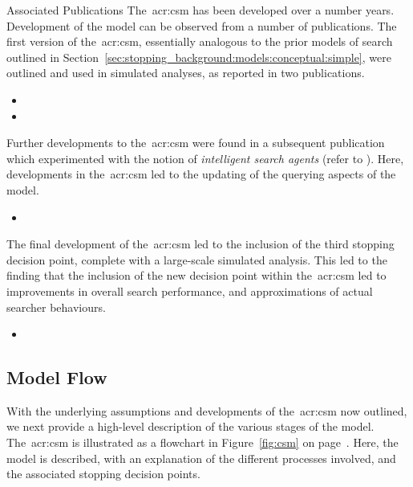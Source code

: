 \vspace*{5mm}
\begin{publications_box}{Associated Publications}
The~\gls{acr:csm} has been developed over a number years. Development of the model can be observed from a number of publications. The first version of the~\gls{acr:csm}, essentially analogous to the prior models of search outlined in Section~\ref{sec:stopping_background:models:conceptual:simple}, were outlined and used in simulated analyses, as reported in two publications.

\begin{itemize}
    \item{}
    \item{}
\end{itemize}

Further developments to the~\gls{acr:csm} were found in a subsequent publication which experimented with the notion of \emph{intelligent search agents} (refer to ). Here, developments in the~\gls{acr:csm} led to the updating of the querying aspects of the model.

\begin{itemize}
    \item{}
\end{itemize}

The final development of the~\gls{acr:csm} led to the inclusion of the third stopping decision point, complete with a large-scale simulated analysis. This led to the finding that the inclusion of the new decision point within the~\gls{acr:csm} led to improvements in overall search performance, and approximations of actual searcher behaviours.

\begin{itemize}
    \item{}
\end{itemize}
\end{publications_box}

\subsection{Model Flow}\label{sec:proposal:csm:flow}
With the underlying assumptions and developments of the~\gls{acr:csm} now outlined, we next provide a high-level description of the various stages of the model. The~\gls{acr:csm} is illustrated as a flowchart in Figure~\ref{fig:csm} on page~\pageref{fig:csm}. Here, the model is described, with an explanation of the different processes involved, and the associated stopping decision points.

